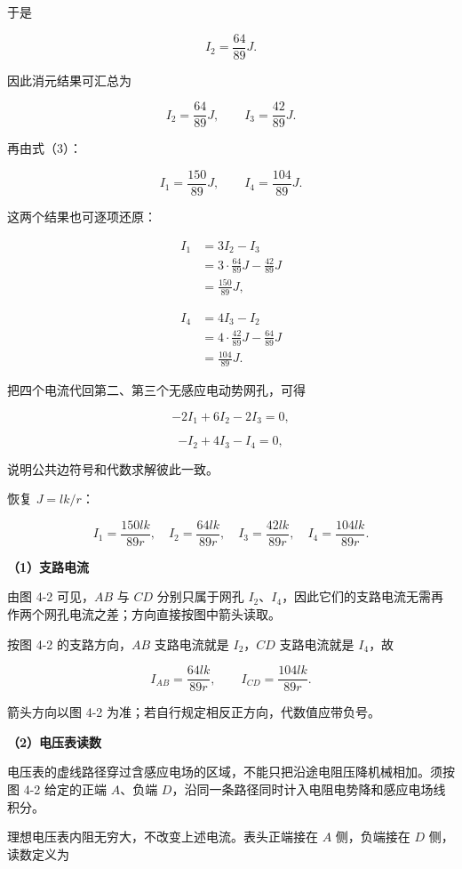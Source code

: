 \documentclass[12pt,a4paper,UTF8]{ctexart}
\begin{document}
于是

\[I_2=\frac{64}{89}J.\]

因此消元结果可汇总为

\[I_2=\frac{64}{89}J,\qquad I_3=\frac{42}{89}J. \tag{6}\]

再由式（3）：

\[I_1=\frac{150}{89}J,\qquad I_4=\frac{104}{89}J. \tag{7}\]

这两个结果也可逐项还原：

\[\begin{aligned}
I_1
&=3I_2-I_3\\
&=3\cdot\frac{64}{89}J-\frac{42}{89}J\\
&=\frac{150}{89}J,
\end{aligned}\]

\[\begin{aligned}
I_4
&=4I_3-I_2\\
&=4\cdot\frac{42}{89}J-\frac{64}{89}J\\
&=\frac{104}{89}J.
\end{aligned}\]

把四个电流代回第二、第三个无感应电动势网孔，可得

\[-2I_1+6I_2-2I_3=0,\]

\[-I_2+4I_3-I_4=0,\]

说明公共边符号和代数求解彼此一致。

恢复 \(J=lk/r\)：

\[\boxed{
I_1=\frac{150lk}{89r},\quad
I_2=\frac{64lk}{89r},\quad
I_3=\frac{42lk}{89r},\quad
I_4=\frac{104lk}{89r}
}. \tag{8}\]

\textbf{（1）支路电流}

由图 4-2 可见，\(AB\) 与 \(CD\) 分别只属于网孔
\(I_2\)、\(I_4\)，因此它们的支路电流无需再作两个网孔电流之差；方向直接按图中箭头读取。

按图 4-2 的支路方向，\(AB\) 支路电流就是 \(I_2\)，\(CD\) 支路电流就是
\(I_4\)，故

\[\boxed{I_{AB}=\frac{64lk}{89r}},\qquad
\boxed{I_{CD}=\frac{104lk}{89r}}. \tag{9}\]

箭头方向以图 4-2 为准；若自行规定相反正方向，代数值应带负号。

\textbf{（2）电压表读数}

电压表的虚线路径穿过含感应电场的区域，不能只把沿途电阻压降机械相加。须按图
4-2 给定的正端 \(A\)、负端
\(D\)，沿同一条路径同时计入电阻电势降和感应电场线积分。

理想电压表内阻无穷大，不改变上述电流。表头正端接在 \(A\) 侧，负端接在
\(D\) 侧，读数定义为
\end{document}
